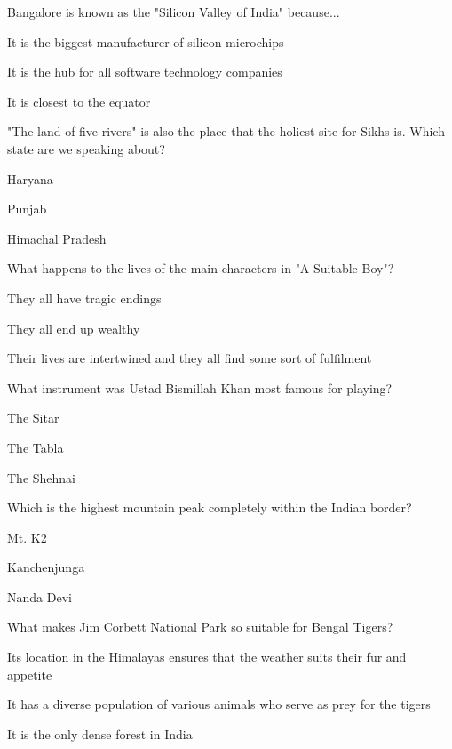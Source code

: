\begin{enhancedmcq}{Bangalore is known as the "Silicon Valley of India" because...}
\item It is the biggest manufacturer of silicon microchips
\item It is the hub for all software technology companies
\item It is closest to the equator

\end{enhancedmcq}
\begin{enhancedmcq}{"The land of five rivers" is also the place that the holiest site for Sikhs is. Which state are we speaking about?}
\item Haryana
\item Punjab
\item Himachal Pradesh

\end{enhancedmcq}
\begin{enhancedmcq}{What happens to the lives of the main characters in "A Suitable Boy"?}
\item They all have tragic endings
\item They all end up wealthy
\item Their lives are intertwined and they all find some sort of fulfilment

\end{enhancedmcq}
\begin{enhancedmcq}{What instrument was Ustad Bismillah Khan most famous for playing?}
\item The Sitar
\item The Tabla
\item The Shehnai

\end{enhancedmcq}
\begin{enhancedmcq}{Which is the highest mountain peak completely within the Indian border?}
\item Mt. K2
\item Kanchenjunga
\item Nanda Devi

\end{enhancedmcq}
\begin{enhancedmcq}{What makes Jim Corbett National Park so suitable for Bengal Tigers?}
\item Its location in the Himalayas ensures that the weather suits their fur and appetite
\item It has a diverse population of various animals who serve as prey for the tigers
\item It is the only dense forest in India

\end{enhancedmcq}
